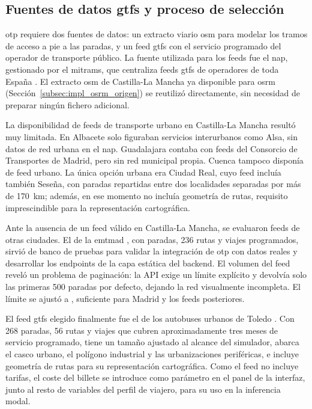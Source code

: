 \subsection[Fuentes de datos GTFS y proceso de selección]{Fuentes de datos \gls{gtfs} y proceso de selección}
\label{subsec:impl_otp_gtfs}

\acrlong{otp} requiere dos fuentes de datos: un extracto viario \gls{osm} para modelar los tramos de acceso a pie a las paradas, y un feed \gls{gtfs} con el servicio programado del operador de transporte público. La fuente utilizada para los feeds fue el \acrlong{nap}, gestionado por el \acrlong{mitrams}, que centraliza feeds \gls{gtfs} de operadores de toda España \cite{NAPHome}. El extracto \gls{osm} de Castilla-La Mancha ya disponible para \gls{osrm} (Sección~\ref{subsec:impl_osrm_origen}) se reutilizó directamente, sin necesidad de preparar ningún fichero adicional.\newline

La disponibilidad de feeds de transporte urbano en Castilla-La Mancha resultó muy limitada. En Albacete solo figuraban servicios interurbanos como Alsa, sin datos de red urbana en el \gls{nap}. Guadalajara contaba con feeds del Consorcio de Transportes de Madrid, pero sin red municipal propia. Cuenca tampoco disponía de feed urbano. La única opción urbana era Ciudad Real, cuyo feed incluía también Seseña, con paradas repartidas entre dos localidades separadas por más de 170~km; además, en ese momento no incluía geometría de rutas, requisito imprescindible para la representación cartográfica.

Ante la ausencia de un feed válido en Castilla-La Mancha, se evaluaron feeds de otras ciudades. El de la \gls{emtmad} \cite{NAPEMTMadrid}, con  paradas, 236 rutas y  viajes programados, sirvió de banco de pruebas para validar la integración de \gls{otp} con datos reales y desarrollar los endpoints de la capa estática del backend. El volumen del feed reveló un problema de paginación: la API exige un límite explícito y devolvía solo las primeras 500 paradas por defecto, dejando la red visualmente incompleta. El límite se ajustó a , suficiente para Madrid y los feeds posteriores.

El feed \gls{gtfs} elegido finalmente fue el de los autobuses urbanos de Toledo \cite{NAPToledoUrbano}. Con 268 paradas, 56 rutas y  viajes que cubren aproximadamente tres meses de servicio programado, tiene un tamaño ajustado al alcance del simulador, abarca el casco urbano, el polígono industrial y las urbanizaciones periféricas, e incluye geometría de rutas para su representación cartográfica. Como el feed no incluye tarifas, el coste del billete se introduce como parámetro en el panel de la interfaz, junto al resto de variables del perfil de viajero, para su uso en la inferencia modal.

